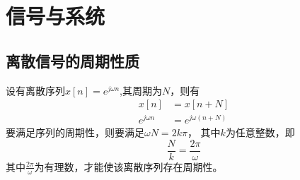 \chapter{信号与系统}

\section{离散信号的周期性质}

设有离散序列$x[n] = e^{j\omega n}$,其周期为$N$，则有
\[
    \begin{aligned}
        x[n] &= x[n+N] \\
        e^{j\omega n} &= e^{j\omega (n+N)}
    \end{aligned}
\]
要满足序列的周期性，则要满足$\omega N = 2k\pi$，
其中$k$为任意整数，即
\begin{equation}
    \frac{N}{k} = \frac{2\pi}{\omega}
    \label{eqa:离散信号的周期性质结论}
\end{equation}
其中$\frac{2\pi}{\omega}$为有理数，才能使该离散序列存在周期性。

